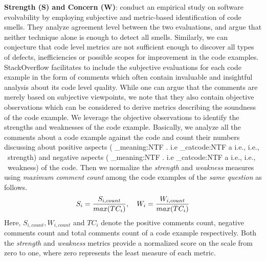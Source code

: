 \documentclass[conference]{IEEEtran}
\makeatletter
\newcommand\latinabbrev[1]{
  \peek_meaning:NTF . {%
    #1\@}%
  { \peek_catcode:NTF a {%
      #1., \@ }%
    {#1., \@}}}
\def\ie{\latinabbrev{i.e}}
\makeatother
\begin{document}
\textbf{Strength (S) and Concern (W)}: \citet{subjective} conduct an empirical study on software evolvability by employing subjective and metric-based identification of code smells.
They analyze agreement level between the two evaluations, and argue that neither technique alone is enough to detect all smells. 
Similarly, we can conjecture that code level metrics are not sufficient enough to discover all types of defects, inefficiencies or possible scopes for improvement in the code examples. StackOverflow facilitates to include the subjective evaluations for each code example in the form of comments which often contain invaluable and insightful analysis about its code level quality. While one can argue that the comments are merely based on subjective viewpoints, we note that they also contain objective observations which can be considered to derive metrics describing the soundness of the code example. We leverage the objective observations to identify the strengths and weaknesses of the code example. Basically, we analyze all the comments about a code example against the code and count their numbers discussing about positive aspects (\ie\ strength) and negative aspects (\ie\ weakness) of the code. Then we normalize the \emph{strength} and \emph{weakness} measures using \emph{maximum comment count} among the code examples of the \emph{same question} as follows.
\begin{equation}
\vspace{-.1cm}
S_{i}=\frac{S_{i, count}}{max(TC_{i})},~~~ W_{i}=\frac{W_{i, count}}{max(TC_{i})}
\vspace{-.1cm}
\end{equation}
Here, $S_{i, count}, W_{i, count}$ and $TC_{i}$ denote the positive comments count, negative comments count and total comments count of a code example respectively. Both the \emph{strength} and \emph{weakness} metrics provide a normalized score on the scale from zero to one, where zero represents the least measure of each metric. 
\end{document}
